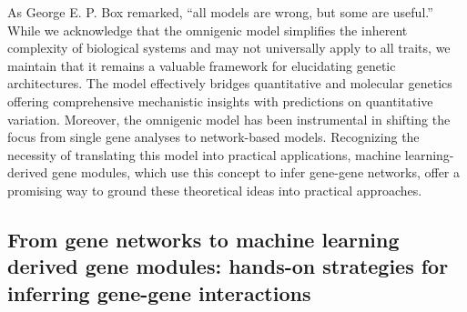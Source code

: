 As George E. P. Box remarked, ``all models are wrong, but some are useful.'' While we acknowledge that the omnigenic model simplifies the inherent complexity of biological systems and may not universally apply to all traits, we maintain that it remains a valuable framework for elucidating genetic architectures.
The model effectively bridges quantitative and molecular genetics offering comprehensive mechanistic insights with predictions on quantitative variation.
Moreover, the omnigenic model has been instrumental in shifting the focus from single gene analyses to network-based models.
Recognizing the necessity of translating this model into practical applications, machine learning-derived gene modules, which use this concept to infer gene-gene networks, offer a promising way to ground these theoretical ideas into practical approaches.

\hypertarget{from-gene-networks-to-machine-learning-derived-gene-modules-hands-on-strategies-for-inferring-gene-gene-interactions}{%
\subsection{From gene networks to machine learning derived gene modules: hands-on strategies for inferring gene-gene interactions}\label{from-gene-networks-to-machine-learning-derived-gene-modules-hands-on-strategies-for-inferring-gene-gene-interactions}}

